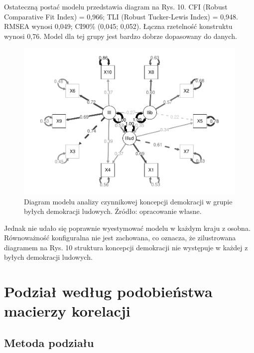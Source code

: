 \documentclass[12pt]{article}
\begin{document}
Ostateczną postać modelu przedstawia diagram na Rys. 10. CFI (Robust Comparative Fit Index) = 0,966; TLI (Robust Tucker-Lewis Index) = 0,948. RMSEA wynosi 0,049; CI90\% (0,045; 0,052). Łączna rzetelność konstruktu wynosi 0,76. Model dla tej grupy jest bardzo dobrze dopasowany do danych.

\begin{figure}

{\centering \includegraphics{text_ASA_files/figure-latex/diagram-east-1} 

}

\caption{Diagram modelu analizy czynnikowej koncepcji demokracji w grupie byłych demokracji ludowych. Źródło: opracowanie własne.}\label{fig:diagram-east}
\end{figure}

Jednak nie udało się poprawnie wyestymować modelu w każdym kraju z osobna. Równoważność konfiguralna nie jest zachowana, co oznacza, że zilustrowana diagramem na Rys. 10 struktura koncepcji demokracji nie występuje w każdej z byłych demokracji ludowych.

\newpage

\hypertarget{podziaux142-wedux142ug-podobieux144stwa-macierzy-korelacji}{%
\section{Podział według podobieństwa macierzy korelacji}\label{podziaux142-wedux142ug-podobieux144stwa-macierzy-korelacji}}

\hypertarget{metoda-podziaux142u}{%
\subsection{Metoda podziału}\label{metoda-podziaux142u}}
\end{document}
